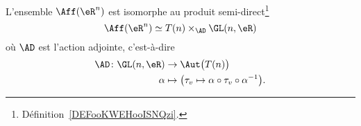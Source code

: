 \begin{proposition}  \label{PROPooTPFZooKtFxhg}
    L'ensemble \( \Aff(\eR^n)\) est isomorphe au produit semi-direct\footnote{Définition~\ref{DEFooKWEHooISNQzi}.}
    \begin{equation}
        \Aff(\eR^n)\simeq  T(n)\times_{\AD}\GL(n,\eR)
    \end{equation}
    où \( \AD\) est l'action adjointe, c'est-à-dire
    \begin{equation}
        \begin{aligned}
            \AD\colon \GL(n,\eR)&\to \Aut\big( T(n) \big) \\
            \alpha&\mapsto\big( \tau_v\mapsto \alpha\circ\tau_v\circ\alpha^{-1}\big).
        \end{aligned}
    \end{equation}
\end{proposition}

